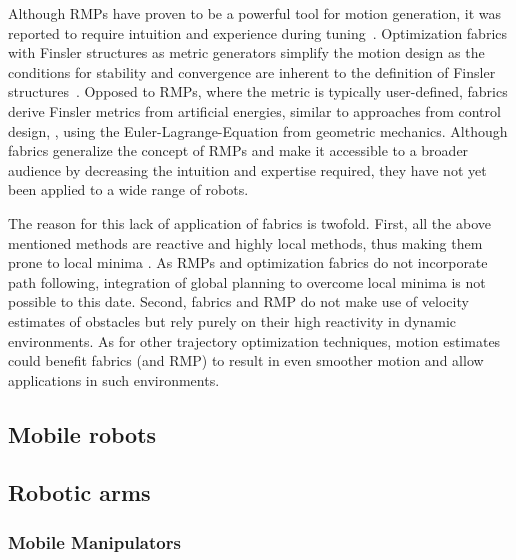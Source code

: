 Although RMPs have proven to be a powerful tool for
motion generation, it was reported to require intuition and experience
during tuning~\cite{Ratliff2020}. Optimization fabrics with Finsler structures
as metric generators simplify the motion design as the conditions for stability
and convergence are inherent to the definition of Finsler
structures~\cite{Ratliff2020,Ratliff2021}. Opposed to RMPs, where the metric is
typically user-defined, fabrics derive Finsler metrics from artificial
energies, similar to approaches from control design, \cite{l2,l3}, using the
Euler-Lagrange-Equation from geometric mechanics. Although fabrics generalize
the concept of RMPs and make it accessible to a broader audience by
decreasing the intuition and expertise required, they have not yet been applied
to a wide range of robots. 

The reason for this lack of application of fabrics is twofold. First, all the
above mentioned methods are reactive and highly local methods, thus making them
prone to local minima \cite{Bhardwaj2021}. As RMPs and optimization
fabrics do not incorporate path following, integration of global
planning to overcome local minima is not possible to this date. Second, fabrics
and RMP do not make use of velocity estimates of obstacles but rely purely on
their high reactivity in dynamic environments. As for other trajectory
optimization techniques, motion estimates could benefit fabrics (and RMP) to
result in even smoother motion and allow applications in such environments. 

\subsection{Mobile robots}
\label{sub:mobile_robots}


\subsection{Robotic arms}
\label{sub:robotic_arms}



\subsubsection{Mobile Manipulators}
\label{subsub:mobile_manipulators}

